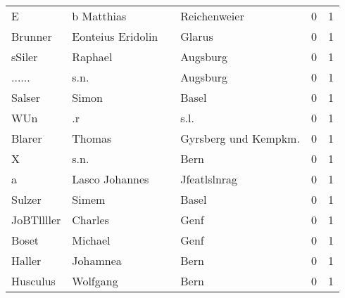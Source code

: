 \begin{tabular}{llllrr}
                        E &                         b Matthias &             &                                Reichenweier &          0 &         1 \\
                  Brunner &                  Eonteius Eridolin &             &                                      Glarus &          0 &         1 \\
                   sSiler &                            Raphael &             &                                    Augsburg &          0 &         1 \\
                   ...... &                               s.n. &             &                                    Augsburg &          0 &         1 \\
                   Salser &                              Simon &             &                                       Basel &          0 &         1 \\
                      WUn &                                 .r &             &                                        s.l. &          0 &         1 \\
                   Blarer &                             Thomas &             &                       Gyrsberg und Kempkm.  &          0 &         1 \\
                        X &                               s.n. &             &                                        Bern &          0 &         1 \\
                        a &                     Lasco Johannes &             &                                Jfeatlslnrag &          0 &         1 \\
                   Sulzer &                              Simem &             &                                       Basel &          0 &         1 \\
               JoBTllller &                            Charles &             &                                        Genf &          0 &         1 \\
                    Boset &                            Michael &             &                                        Genf &          0 &         1 \\
                   Haller &                           Johamnea &             &                                        Bern &          0 &         1 \\
                 Husculus &                           Wolfgang &             &                                        Bern &          0 &         1 \\

\end{tabular}
